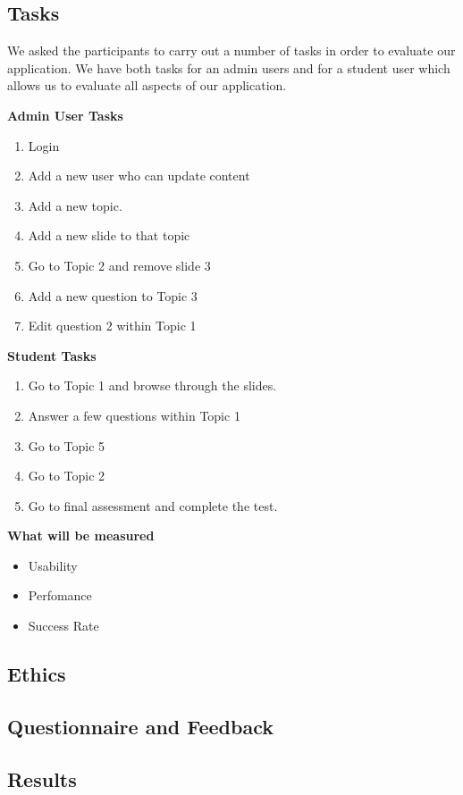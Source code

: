 \documentclass{l3proj}
\begin{document}
\subsection{Tasks}

We asked the participants to carry out a number of tasks in order to evaluate our application. We have both tasks for an admin users and for a student user which allows us to evaluate all aspects of our application.

\textbf{Admin User Tasks}

\begin{enumerate}
\item Login
\item Add a new user who can update content
\item Add a new topic.
\item Add a new slide to that topic
\item Go to Topic 2 and remove slide 3
\item Add a new question to Topic 3
\item Edit question 2 within Topic 1
\end{enumerate}

\textbf{Student Tasks}

\begin{enumerate}
\item Go to Topic 1 and browse through the slides.
\item Answer a few questions within Topic 1
\item Go to Topic 5
\item Go to Topic 2
\item Go to final assessment and complete the test.
\end{enumerate}

\textbf{What will be measured}

\begin{itemize}
\item Usability
\item Perfomance
\item Success Rate
\end{itemize}

\subsection{Ethics}

\subsection{Questionnaire and Feedback}

\subsection{Results}
\end{document}
